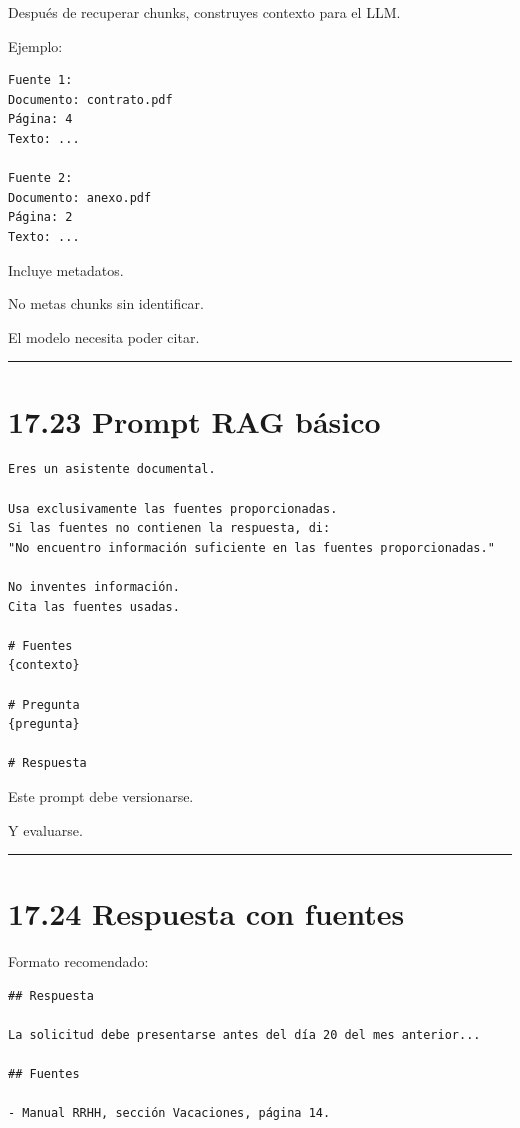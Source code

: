Después de recuperar chunks, construyes contexto para el LLM.

Ejemplo:

\begin{lstlisting}
Fuente 1:
Documento: contrato.pdf
Página: 4
Texto: ...

Fuente 2:
Documento: anexo.pdf
Página: 2
Texto: ...
\end{lstlisting}

Incluye metadatos.

No metas chunks sin identificar.

El modelo necesita poder citar.

\begin{center}\rule{0.5\linewidth}{0.5pt}\end{center}

\section{17.23 Prompt RAG básico}\label{prompt-rag-buxe1sico}

\begin{lstlisting}
Eres un asistente documental.

Usa exclusivamente las fuentes proporcionadas.
Si las fuentes no contienen la respuesta, di:
"No encuentro información suficiente en las fuentes proporcionadas."

No inventes información.
Cita las fuentes usadas.

# Fuentes
{contexto}

# Pregunta
{pregunta}

# Respuesta
\end{lstlisting}

Este prompt debe versionarse.

Y evaluarse.

\begin{center}\rule{0.5\linewidth}{0.5pt}\end{center}

\section{17.24 Respuesta con fuentes}\label{respuesta-con-fuentes}

Formato recomendado:

\begin{lstlisting}
## Respuesta

La solicitud debe presentarse antes del día 20 del mes anterior...

## Fuentes

- Manual RRHH, sección Vacaciones, página 14.
\end{lstlisting}

